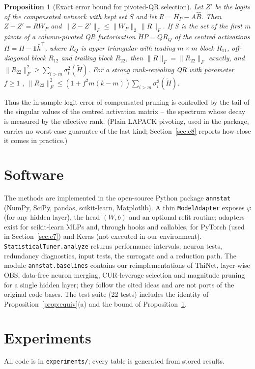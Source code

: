 \documentclass[11pt,a4paper]{article}
\newtheorem{proposition}{Proposition}
\theoremstyle{remark}\newtheorem{remark}{Remark}
\begin{document}
\begin{proposition}[Exact error bound for pivoted-QR selection]\label{prop:bound}
Let $Z'$ be the logits of the compensated network with kept set $S$ and let $R=H_P-A\hat B$. Then $Z-Z'=RW_P$ and $\|Z-Z'\|_F\le\|W_P\|_2\,\|R\|_F$. If $S$ is the set of the first $m$ pivots of a column-pivoted QR factorisation $\tilde H P=QR_Q$ of the centred activations $\tilde H=H-\mathbf 1\bar h^\top$, where $R_Q$ is upper triangular with leading $m\times m$ block $R_{11}$, off-diagonal block $R_{12}$ and trailing block $R_{22}$, then $\|R\|_F=\|R_{22}\|_F$ exactly, and $\|R_{22}\|_F^2\ge\sum_{i>m}\sigma_i^2(\tilde H)$. For a strong rank-revealing QR with parameter $f\ge1$ \cite{gu1996}, $\|R_{22}\|_F^2\le(1+f^2m(k-m))\sum_{i>m}\sigma_i^2(\tilde H)$.
\end{proposition}
\noindent Thus the in-sample logit error of compensated pruning is controlled by the tail of the singular values of the centred activation matrix -- the spectrum whose decay is measured by the effective rank. (Plain LAPACK pivoting, used in the package, carries no worst-case guarantee of the last kind; Section~\ref{sec:e8} reports how close it comes in practice.)

\section{Software}
The methods are implemented in the open-source Python package \texttt{annstat} (NumPy, SciPy, pandas, scikit-learn, Matplotlib). A thin \texttt{ModelAdapter} exposes $\varphi$ (for any hidden layer), the head $(W,b)$ and an optional refit routine; adapters exist for scikit-learn MLPs and, through hooks and callables, for PyTorch (used in Section~\ref{sec:e7}) and Keras (not executed in our environment). \texttt{StatisticalTuner.analyze} returns performance intervals, neuron tests, redundancy diagnostics, input tests, the surrogate and a reduction path. The module \texttt{annstat.baselines} contains our reimplementations of ThiNet, layer-wise OBS, data-free neuron merging, CUR-leverage selection and magnitude pruning for a single hidden layer; they follow the cited ideas and are not ports of the original code bases. The test suite (22 tests) includes the identity of Proposition~\ref{prop:equiv}(a) and the bound of Proposition~\ref{prop:bound}.

\section{Experiments}
All code is in \texttt{experiments/}; every table is generated from stored results.
\end{document}
